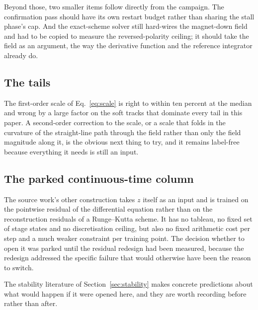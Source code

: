 \documentclass[11pt,a4paper]{article}
\begin{document}
Beyond those, two smaller items follow directly from the campaign. The
confirmation pass should have its own restart budget rather than sharing the
stall phase's cap. And the exact-scheme solver still hard-wires the magnet-down
field and had to be copied to measure the reversed-polarity ceiling; it should
take the field as an argument, the way the derivative function and the reference
integrator already do.

\subsection{The tails}

The first-order scale of Eq.~\eqref{eq:scale} is right to within ten percent at
the median and wrong by a large factor on the soft tracks that dominate every
tail in this paper. A second-order correction to the scale, or a scale that
folds in the curvature of the straight-line path through the field rather than
only the field magnitude along it, is the obvious next thing to try, and it
remains label-free because everything it needs is still an input.

\subsection{The parked continuous-time column}

The source work's other construction takes $z$ itself as an input and is trained
on the pointwise residual of the differential equation rather than on the
reconstruction residuals of a Runge--Kutta scheme. It has no tableau, no fixed
set of stage states and no discretisation ceiling, but also no fixed arithmetic
cost per step and a much weaker constraint per training point. The decision
whether to open it was parked until the residual redesign had been measured,
because the redesign addressed the specific failure that would otherwise have
been the reason to switch.

The stability literature of Section~\ref{sec:stability} makes concrete
predictions about what would happen if it were opened here, and they are worth
recording before rather than after.
\end{document}
